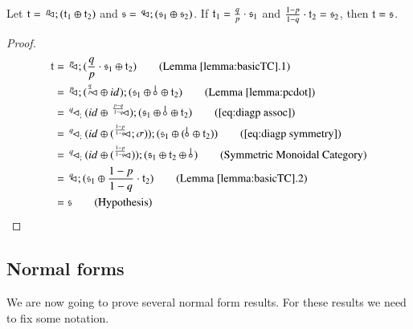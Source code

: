 \begin{lemma}\label{lemma:fractions}
Let $\mathfrak{t}=\,^p\!\! \lhd_{} ; (\mathfrak{t}_1 \oplus \mathfrak{t}_2)$ and $\mathfrak{s}=\, ^q\!\! \lhd_{} ; (\mathfrak{s}_1 \oplus \mathfrak{s}_2)$. If $\mathfrak{t}_1=\frac{q}{p}\cdot \mathfrak{s}_1$ and $\frac{1-p}{1-q} \cdot \mathfrak{t}_2 = \mathfrak{s}_2$, then $\mathfrak{t} = \mathfrak{s}$.
\end{lemma}
\begin{proof}
\begin{align}
\t &=\,  \diagp{};( \frac{q}{p} \cdot \s_1 \oplus \t_2  )\tag{Lemma \ref{lemma:basicTC}.1}\\
&=\, \diagp{}; (\diagpX{\frac{q}{p}\,\,}{} \oplus \id{}) ; (\s_1 \oplus \bang{} \oplus \t_2) \tag{Lemma \ref{lemma:pcdot}}\\
&=\, \diagq; (\id{} \oplus\, \diagpX{\frac{p-q}{1-q}\,\,}{}) ; (\s_1 \oplus \bang{} \oplus \t_2) \tag{\ref{eq:diagp assoc}} \\
&=\, \diagq; (\id{} \oplus ( \diagpX{\frac{1-p}{1-q}\,\,}{}; \symm)) ; (\s_1 \oplus (\bang{} \oplus \t_2)) \tag{\ref{eq:diagp symmetry}} \\
&=\, \diagq; (\id{} \oplus ( \diagpX{\frac{1-p}{1-q}\,\,}{})) ; (\s_1 \oplus  \t_2 \oplus \bang{}) \tag{Symmetric Monoidal Category}\\
&=\,  \diagq{};( \s_1 \oplus \frac{1-p}{1-q} \cdot \t_2  ) \tag{Lemma \ref{lemma:basicTC}.2}\\
&=\s \tag{Hypothesis}
\end{align}
\end{proof}


\subsection{Normal forms}\label{app:normal forms}
We are now going to prove several normal form results. For these results we need to fix some notation.





